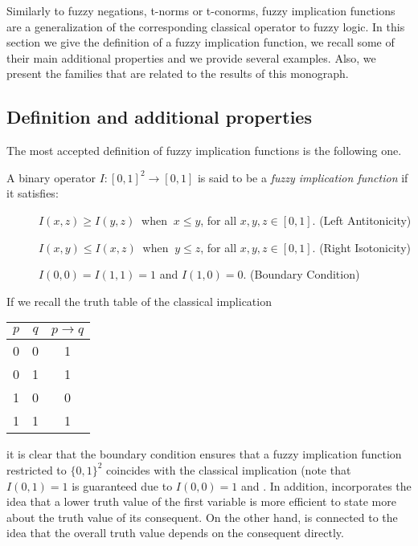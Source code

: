Similarly to fuzzy negations, t-norms or t-conorms, fuzzy implication functions are a generalization of the corresponding classical operator to fuzzy logic. In this section we give the definition of a fuzzy implication function, we recall some of their main additional properties and we provide several examples. Also, we present the families that are related to the results of this monograph.

\subsection{Definition and additional properties}\label{subsection:definition&additionalproperties}
The most accepted definition of fuzzy implication functions is the following one.
\begin{definition}\label{defimp}
	A binary operator $I:[0,1]^2 \to [0,1]$ is said to be a \emph{fuzzy implication function} if it satisfies:
	\begin{description}
		\item[\Ione]  $I(x,z)\geq I(y,z)\ $  when  $\ x\leq y$, for all $x,y,z\in[0,1]$. \hfill (Left Antitonicity)
		\item[\Itwo]  $I(x,y)\leq I(x,z)\ $  when  $\ y\leq z$, for all $x,y,z\in[0,1]$. \hfill (Right Isotonicity)
		\item[\Ithree]  $I(0,0)=I(1,1)=1$ and $I(1,0)=0$. \hfill (Boundary Condition)
	\end{description}
\end{definition}
If we recall the truth table of the classical implication
\begin{center}
	\begin{tabular}{|c|c|c|}
		\hline
		$p$ & $q$ & $p \to q$ \\ \hline
		0   & 0   & 1         \\ \hline
		0   & 1   & 1         \\ \hline
		1   & 0   & 0         \\ \hline
		1   & 1   & 1         \\ \hline
	\end{tabular}
\end{center}
\noindent it is clear that the boundary condition \Ithree ensures that a fuzzy implication function restricted to $\{0,1\}^2$ coincides with the classical implication (note that $I(0,1)=1$ is guaranteed due to $I(0,0)=1$ and \Itwo. In addition, \Ione incorporates the idea that a lower truth value of the first variable is more efficient to state more about the truth value of its consequent. On the other hand, \Itwo is connected to the idea that the overall truth value depends on the consequent directly.

